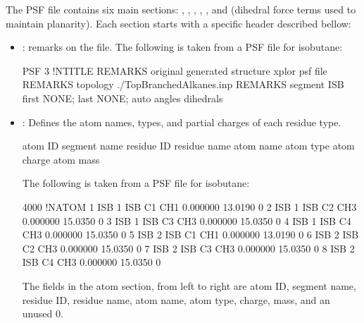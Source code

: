 \documentclass[letterpaper,10pt,english]{sphinxmanual}
\begin{document}
\sphinxAtStartPar
The PSF file contains six main sections: , , , , , and  (dihedral force terms used to maintain
planarity). Each section starts with a specific header described bellow:
\begin{itemize}
\item {} 
\sphinxAtStartPar
{}: remarks on the file.
The following is taken from a PSF file for isobutane:

\begin{sphinxVerbatim}[commandchars=\\\{\}]
PSF
      3  !NTITLE
REMARKS  original generated structure x\PYGZhy{}plor psf file
REMARKS  topology ./Top\PYGZus{}Branched\PYGZus{}Alkanes.inp
REMARKS  segment ISB \PYGZob{} first NONE; last NONE; auto angles dihedrals \PYGZcb{}
\end{sphinxVerbatim}

\item {} 
\sphinxAtStartPar
{}: Defines the atom names, types, and partial charges of each residue type.

\begin{sphinxVerbatim}[commandchars=\\\{\}]
atom    ID
segment name
residue ID
residue name
atom    name
atom    type
atom    charge
atom    mass
\end{sphinxVerbatim}

\sphinxAtStartPar
The following is taken from a PSF file for isobutane:

\begin{sphinxVerbatim}[commandchars=\\\{\}]
4000 !NATOM
1    ISB  1  ISB    C1    CH1    0.000000   13.0190  0
2    ISB  1  ISB    C2    CH3    0.000000   15.0350  0
3    ISB  1  ISB    C3    CH3    0.000000   15.0350  0
4    ISB  1  ISB    C4    CH3    0.000000   15.0350  0
5    ISB  2  ISB    C1    CH1    0.000000   13.0190  0
6    ISB  2  ISB    C2    CH3    0.000000   15.0350  0
7    ISB  2  ISB    C3    CH3    0.000000   15.0350  0
8    ISB  2  ISB    C4    CH3    0.000000   15.0350  0
\end{sphinxVerbatim}

\sphinxAtStartPar
The fields in the atom section, from left to right are atom ID, segment name, residue ID, residue name, atom name, atom type, charge, mass, and an unused 0.


\end{itemize}
\end{document}
